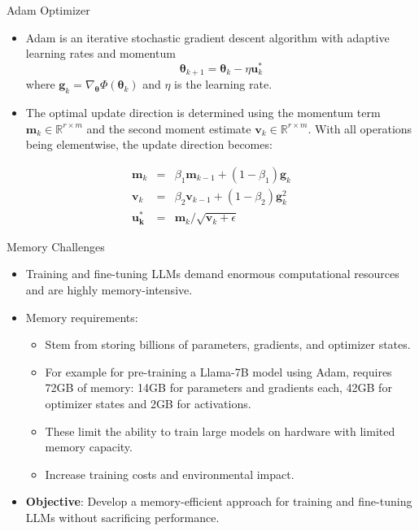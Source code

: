 \documentclass{beamer}
\begin{document}
\begin{frame}{Adam Optimizer}
    \begin{itemize}
        \item Adam \citep{kingmaAdamMethodStochastic2014} is an iterative stochastic gradient descent algorithm with adaptive learning rates and momentum
        \[
            \mathbf{\theta}_{k+1} = \mathbf{\theta}_{k} - \eta \mathbf{u}_{k}^{*}
        \]
        where \(\mathbf{g}_{k} = \nabla_{\mathbf{\theta}} \Phi(\mathbf{\theta}_{k})\) and \(\eta\) is the learning rate.
        \vspace{0.5em}
        \item The optimal update direction is determined using the momentum term \(\mathbf{m}_{k} \in \mathbb{R}^{r\times m}\) and the second moment estimate \(\mathbf{v}_{k} \in \mathbb{R}^{r\times m}\). With all operations being elementwise, the update direction becomes:
    \end{itemize}
    \begin{eqnarray}
        \mathbf{m}_{k} &=& \beta_{1} \mathbf{m}_{k-1} + (1-\beta_{1}) \mathbf{g}_{k} \\
        \mathbf{v}_{k} &=& \beta_{2} \mathbf{v}_{k-1} + (1-\beta_2) \mathbf{g}^{2}_{k}  \\
        \mathbf{u_{k}^{*}} &=& \mathbf{m}_{k} / \sqrt{\mathbf{v}_{k} + \epsilon}
        \label{eq:adam_update}
    \end{eqnarray}
\end{frame}

\begin{frame}{Memory Challenges}
    \begin{itemize}
        \item Training and fine-tuning LLMs demand enormous computational resources and are highly memory-intensive.
        \item Memory requirements: 
        \begin{itemize}
            \item Stem from storing billions of parameters, gradients, and optimizer states.
            \vspace{0.5em}
            \item For example for pre-training a Llama-7B model using Adam, requires 72GB of memory: 14GB for parameters and gradients each, 42GB for optimizer states and 2GB for activations.
            \vspace{0.5em}
            \item These limit the ability to train large models on hardware with limited memory capacity.
            \vspace{0.5em}
            \item Increase training costs and environmental impact.
        \end{itemize}
        \item \textbf{Objective}: Develop a memory-efficient approach for training and fine-tuning LLMs without sacrificing performance.
    \end{itemize}
\end{frame}
\end{document}
